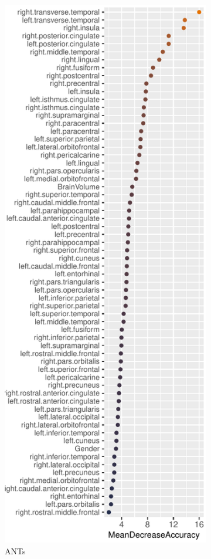 \documentclass[12pt,]{article}
\begin{document}
\begin{figure}[htb]
  \centering
  \begin{subfigure}{0.4\textwidth}
    \centering
    \includegraphics[width=0.7\linewidth]{Figures/rfImportance_SRPB1600_ANTs.pdf}
    \caption{ANTs}
  \end{subfigure}%
  \begin{subfigure}{0.4\textwidth}
    \centering

\end{subfigure}
\end{figure}
\end{document}
